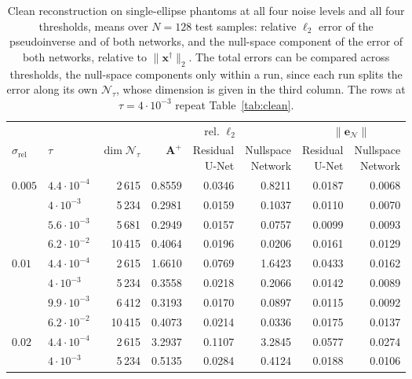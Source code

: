 \documentclass{article}
\numberwithin{equation}{section}
\begin{document}
\begin{table}[htbp]
\centering
\caption{Clean reconstruction on single-ellipse phantoms at all four noise levels and all four
thresholds, means over $N=128$ test samples: relative $\ell_2$ error of the pseudoinverse and of both
networks, and the null-space component of the error of both networks, relative to
$\lVert\mathbf{x}^\dagger\rVert_2$. The total errors can be compared across thresholds, the null-space
components only within a run, since each run splits the error along its own $\mathcal{N}_\tau$,
whose dimension is given in the third column. The rows at $\tau=4\cdot10^{-3}$ repeat
Table~\ref{tab:clean}.}\label{tab:clean-tau}
\small\setlength{\tabcolsep}{4pt}
\begin{tabular}{l l r rrr rr}
\toprule
 & & & \multicolumn{3}{c}{rel. $\ell_2$} & \multicolumn{2}{c}{$\lVert\mathbf{e}_{\mathcal{N}}\rVert$} \\
\cmidrule(lr){4-6}\cmidrule(lr){7-8}
$\sigma_\text{rel}$ & $\tau$ & $\dim\mathcal{N}_\tau$ & $\mathbf{A}^{+}$ & \shortstack{Residual\\U-Net} & \shortstack{Nullspace\\Network} & \shortstack{Residual\\U-Net} & \shortstack{Nullspace\\Network} \\
\midrule
$0.005$ & $4.4\cdot10^{-4}$ & 2\,615  & 0.8559 & 0.0346 & 0.8211 & 0.0187 & 0.0068 \\
        & $4\cdot10^{-3}$   & 5\,234  & 0.2981 & 0.0159 & 0.1037 & 0.0110 & 0.0070 \\
        & $5.6\cdot10^{-3}$ & 5\,681  & 0.2949 & 0.0157 & 0.0757 & 0.0099 & 0.0093 \\
        & $6.2\cdot10^{-2}$ & 10\,415 & 0.4064 & 0.0196 & 0.0206 & 0.0161 & 0.0129 \\
\midrule
$0.01$  & $4.4\cdot10^{-4}$ & 2\,615  & 1.6610 & 0.0769 & 1.6423 & 0.0433 & 0.0162 \\
        & $4\cdot10^{-3}$   & 5\,234  & 0.3558 & 0.0218 & 0.2066 & 0.0142 & 0.0089 \\
        & $9.9\cdot10^{-3}$ & 6\,412  & 0.3193 & 0.0170 & 0.0897 & 0.0115 & 0.0092 \\
        & $6.2\cdot10^{-2}$ & 10\,415 & 0.4073 & 0.0214 & 0.0336 & 0.0175 & 0.0137 \\
\midrule
$0.02$  & $4.4\cdot10^{-4}$ & 2\,615  & 3.2937 & 0.1107 & 3.2845 & 0.0577 & 0.0274 \\
        & $4\cdot10^{-3}$   & 5\,234  & 0.5135 & 0.0284 & 0.4124 & 0.0188 & 0.0106 \\

\end{tabular}
\end{table}
\end{document}
